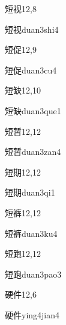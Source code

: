 \begin{entry}{短视}{12,8}
  \begin{phonetics}{短视}{duan3shi4}
  \end{phonetics}
\end{entry}

\begin{entry}{短促}{12,9}
  \begin{phonetics}{短促}{duan3cu4}
  \end{phonetics}
\end{entry}

\begin{entry}{短缺}{12,10}
  \begin{phonetics}{短缺}{duan3que1}
  \end{phonetics}
\end{entry}

\begin{entry}{短暂}{12,12}
  \begin{phonetics}{短暂}{duan3zan4}
  \end{phonetics}
\end{entry}

\begin{entry}{短期}{12,12}
  \begin{phonetics}{短期}{duan3qi1}
  \end{phonetics}
\end{entry}

\begin{entry}{短裤}{12,12}
  \begin{phonetics}{短裤}{duan3ku4}
  \end{phonetics}
\end{entry}

\begin{entry}{短跑}{12,12}
  \begin{phonetics}{短跑}{duan3pao3}
  \end{phonetics}
\end{entry}

\begin{entry}{硬件}{12,6}
  \begin{phonetics}{硬件}{ying4jian4}
  \end{phonetics}
\end{entry}

